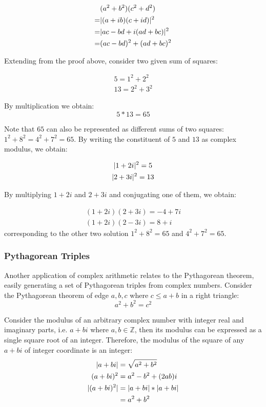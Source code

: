 \documentclass[12pt]{article}
\begin{document}
	\begin{align*}
		  & (a^2 + b^2)(c^2 + d^2) \\
		= & \lvert (a + ib)(c + id) \rvert^2 \\
		= & \lvert ac - bd + i(ad + bc) \rvert^2 \\
		= & (ac - bd)^2 + (ad + bc)^2
	\end{align*}
	 
	Extending from the proof above, consider two given sum of squares:
	
	\begin{gather*}
		5 = 1^2 + 2^2 \\
		13 = 2^2 + 3^2
	\end{gather*}
	
	By multiplication we obtain: $$5 * 13 = 65$$
	
	Note that $65$ can also be represented as different sums of two squares: $1^2 + 8^2 = 4^2 + 7^2 = 65$. By writing the constituent of $5$ and $13$ as complex modulus, we obtain:
	
	\begin{gather*}
		\lvert 1 + 2i \rvert^2 = 5 \\
		\lvert 2 + 3i \rvert^2 = 13
	\end{gather*}
	
	By multiplying $1 + 2i$ and $2 + 3i$ and conjugating one of them, we obtain:
	
	\begin{gather*}
		(1 + 2i)(2 + 3i) = -4 + 7i \\
		(1 + 2i)(2 - 3i) = 8 + i
	\end{gather*}
	corresponding to the other two solution $1^2 + 8^2 = 65$ and $4^2 + 7^2 = 65$.
	
	\subsubsection{Pythagorean Triples}
	
	Another application of complex arithmetic relates to the Pythagorean theorem, easily generating a set of Pythagorean triples from complex numbers. Consider the Pythagorean theorem of edge $a, b, c$ where $c \leq a + b$ in a right triangle: $$a^2 + b^2 = c^2$$
	
	Consider the modulus of an arbitrary complex number with integer real and imaginary parts, i.e. $a + bi$ where $a, b \in \mathbb{Z}$, then its modulus can be expressed as a single square root of an integer. Therefore, the modulus of the square of any $a + bi$ of integer coordinate is an integer:
	\begin{align*}
		\lvert a + bi \rvert &= \sqrt{a^2 + b^2} \\
		(a + bi)^2 &= a^2 - b^2 + (2ab)i  \\
		\lvert (a + bi)^2 \rvert &= \lvert a + bi \rvert * \lvert a + bi \rvert \\
		& = a^2 + b^2
	\end{align*}
	
\end{document}
